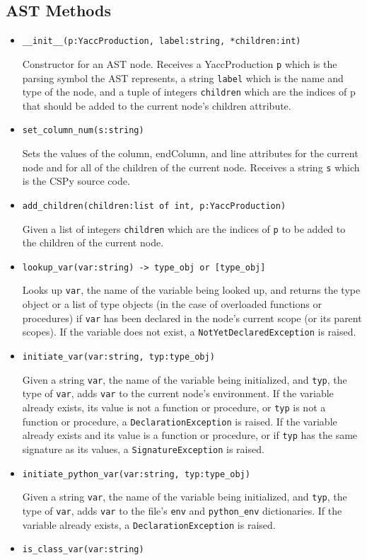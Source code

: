 \documentclass{article}
\begin{document}
\subsection{AST Methods}
\begin{itemize}
\item \verb|__init__(p:YaccProduction, label:string, *children:int)|

Constructor for an AST node. Receives a YaccProduction \verb|p| which is the parsing symbol the AST represents, a string \verb|label| which is the name and type of the node, and a tuple of integers \verb|children| which are the indices of p that should be added to the current node's children attribute.
\item \verb|set_column_num(s:string)| 

Sets the values of the column, endColumn, and line attributes for the current node and for all of the children of the current node. Receives a string \verb|s| which is the CSPy source code.
\item \verb|add_children(children:list of int, p:YaccProduction)| 

Given a list of integers \verb|children| which are the indices of \verb|p| to be added to the children of the current node.
\item \verb|lookup_var(var:string) -> type_obj or [type_obj]| 

Looks up \verb|var|, the name of the variable being looked up, and returns the type object or a list of type objects (in the case of overloaded functions or procedures) if \verb|var| has been declared in the node's current scope (or its parent scopes). If the variable does not exist, a \verb|NotYetDeclaredException| is raised.
\item \verb|initiate_var(var:string, typ:type_obj)| 

Given a string \verb|var|, the name of the variable being initialized, and \verb|typ|, the type of \verb|var|, adds \verb|var| to the current node's environment. If the variable already exists, its value is not a function or procedure, or \verb|typ| is not a function or procedure, a \verb|DeclarationException| is raised. If the variable already exists and its value is a function or procedure, or if \verb|typ| has the same signature as its values, a \verb|SignatureException| is raised.
\item \verb|initiate_python_var(var:string, typ:type_obj)|

Given a string \verb|var|, the name of the variable being initialized, and \verb|typ|, the type of \verb|var|, adds \verb|var| to the file's \verb|env| and \verb|python_env| dictionaries. If the variable already exists, a \verb|DeclarationException| is raised.
\item \verb|is_class_var(var:string)|


\end{itemize}
\end{document}
